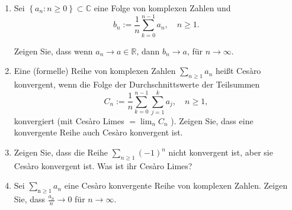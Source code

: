 \documentclass[11pt]{article}
\newenvironment{problem}[2][Beispiel]{
    \begin{trivlist}
        \item[\hskip \labelsep {\bfseries #1}\hskip \labelsep {\bfseries #2.}] \itshape}{
    \end{trivlist}\normalshape
}
\begin{document}
    \begin{problem}{5}
        \begin{enumerate}[label = (\alph*)]
            \item Sei $\left\{a_n: n \geq 0\right\} \subset \mathbb{C}$ eine Folge von komplexen Zahlen und
            $$
            b_n:=\frac{1}{n} \sum_{k=0}^{n-1} a_n, \quad n \geq 1 .
            $$

            Zeigen Sie, dass wenn $a_n \rightarrow a \in \mathbb{R}$, dann $b_n \rightarrow a$, für $n
            \rightarrow \infty$.
            \item Eine (formelle) Reihe von komplexen Zahlen $\sum_{n \geq 1} a_n$ heißt Cesàro konvergent,
            wenn die Folge der Durchschnittswerte der Teilsummen
            $$
            C_n:=\frac{1}{n} \sum_{k=0}^{n-1} \sum_{j=1}^k a_j, \quad n \geq 1,
            $$
            konvergiert (mit Cesàro Limes $=\lim _n C_n$ ). Zeigen Sie, dass eine konvergente Reihe auch Cesàro
            konvergent ist.
            \item Zeigen Sie, dass die Reihe $\sum_{n \geq 1}(-1)^n$ nicht konvergent ist, aber sie Cesàro
            konvergent ist. Was ist ihr Cesàro Limes?
            \item Sei $\sum_{\mathrm{n} \geq 1} a_n$ eine Cesàro konvergente Reihe von komplexen Zahlen.
            Zeigen Sie, dass $\frac{a_n}{n} \rightarrow 0$ für $n \rightarrow \infty$.
        \end{enumerate}
    \end{problem}
\end{document}
